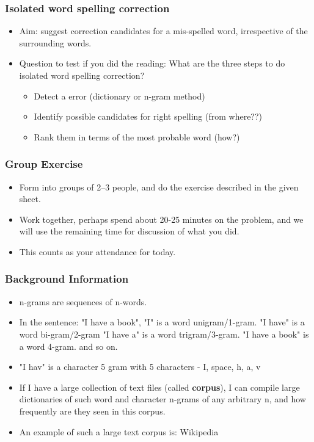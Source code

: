 \documentclass{beamer}
\begin{document}
\begin{frame}
\frametitle{Isolated word spelling correction}
\begin{itemize}
\item Aim: suggest correction candidates for a mis-spelled word, irrespective of the surrounding words.
\item Question to test if you did the reading: What are the three steps to do isolated word spelling correction? \pause
\begin{itemize}
\item Detect a error (dictionary or n-gram method)
\item Identify possible candidates for right spelling (from where??)
\item Rank them in terms of the most probable word (how?)
\end{itemize}
\end{itemize}
\end{frame}

\begin{frame}
\frametitle{Group Exercise}
\begin{itemize}
\item Form into groups of 2--3 people, and do the exercise described in the given sheet.
\item Work together, perhaps spend about 20-25 minutes on the problem, and we will use the remaining time for discussion of what you did.
\item This counts as your attendance for today.
\end{itemize}
\end{frame}

\begin{frame}
\frametitle{Background Information}
\begin{itemize}
\item n-grams are sequences of n-words.
\item In the sentence: "I have a book", "I" is a word unigram/1-gram. "I have" is a word bi-gram/2-gram "I have a" is a word trigram/3-gram. "I have a book" is a word 4-gram. and so on.
\item "I hav" is a character 5 gram with 5 characters - I, space, h, a, v
\item If I have a large collection of text files (called \textbf{corpus}), I can compile large dictionaries of such word and character n-grams of any arbitrary n, and how frequently are they seen in this corpus.
\item An example of such a large text corpus is: Wikipedia
\end{itemize}
\end{frame}
\end{document}
